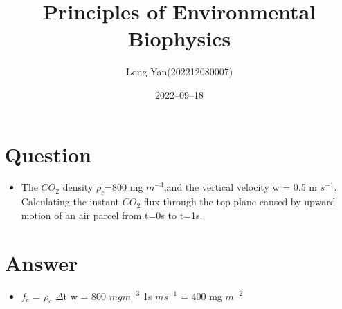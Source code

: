 \documentclass[12pt]{article}
\title{Principles of Environmental Biophysics}
\author{Long Yan(202212080007)}
\date{2022–09–18}
\begin{document}
\maketitle

\section{Question}


\begin{itemize}
\item The $CO_2$ density $\rho_c$=800 mg $m^{-3}$,and the vertical velocity w = 0.5 m $s^{-1}$.
Calculating the instant $CO_2$ flux through the top plane caused by upward motion of an air parcel
from t=0s to t=1s.
\end{itemize}
\section{Answer}
\begin{itemize}
\item $f_c$ = $\rho_c$ \cdot $\Delta$t \cdot w =  800 $mg m^{-3}$ \cdot 1s $m s^{-1}$ = 400 mg $m^{-2}$
\end{itemize}
\end{document}
